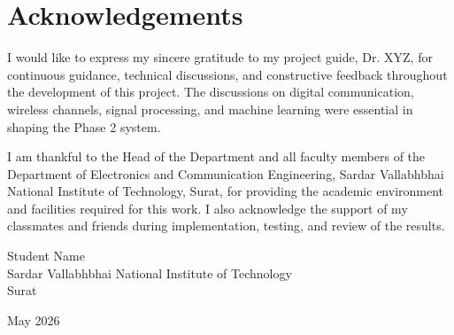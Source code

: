 \chapter*{Acknowledgements}

I would like to express my sincere gratitude to my project guide,
Dr. XYZ, for continuous guidance, technical discussions, and constructive
feedback throughout the development of this project. The discussions on
digital communication, wireless channels, signal processing, and machine
learning were essential in shaping the Phase 2 system.

I am thankful to the Head of the Department and all faculty members of the
Department of Electronics and Communication Engineering, Sardar Vallabhbhai
National Institute of Technology, Surat, for providing the academic
environment and facilities required for this work. I also acknowledge the
support of my classmates and friends during implementation, testing, and
review of the results.

\begin{flushright} 
Student Name\\[0.01in]
Sardar Vallabhbhai National Institute of Technology\\
Surat\\
\end{flushright}

\begin{flushleft} 
May 2026 \\
\end{flushleft}
